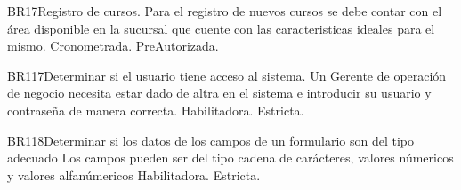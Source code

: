 \begin{BussinesRule}{BR17}{Registro de cursos.} 
	\BRitem[Descripción:] Para el registro de nuevos cursos se debe contar con el área disponible en la sucursal que cuente con las caracteristicas ideales para el mismo.
	\BRitem[Tipo:] Cronometrada.
	\BRitem[Nivel:] PreAutorizada.
\end{BussinesRule}

\begin{BussinesRule}{BR117}{Determinar si el usuario tiene acceso al sistema.} 
	\BRitem[Descripción:] Un Gerente de operación de negocio necesita estar dado de altra en el sistema e introducir su usuario y contraseña de manera correcta.
	\BRitem[Tipo:] Habilitadora.
	\BRitem[Nivel:] Estricta.
\end{BussinesRule}

\begin{BussinesRule}{BR118}{Determinar si los datos de los campos de un formulario son del tipo adecuado} 
	\BRitem[Descripción:] Los campos pueden ser del tipo cadena de carácteres, valores númericos y valores alfanúmericos
	\BRitem[Tipo:] Habilitadora.
	\BRitem[Nivel:] Estricta.
\end{BussinesRule}


